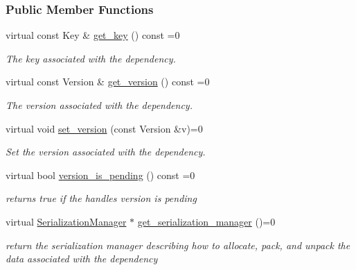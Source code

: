 \subsubsection*{Public Member Functions}
\begin{DoxyCompactItemize}
\item 
virtual const Key \& \hyperlink{classdarma__runtime_1_1abstract_1_1frontend_1_1_dependency_handle_a1691ddba9c8d08dbefe010e6d10b789a}{get\+\_\+key} () const  =0
\begin{DoxyCompactList}\small\item\em The key associated with the dependency. \end{DoxyCompactList}\item 
virtual const Version \& \hyperlink{classdarma__runtime_1_1abstract_1_1frontend_1_1_dependency_handle_a2cc4baf6ffc4fcd03f083c5a24a536de}{get\+\_\+version} () const  =0
\begin{DoxyCompactList}\small\item\em The version associated with the dependency. \end{DoxyCompactList}\item 
virtual void \hyperlink{classdarma__runtime_1_1abstract_1_1frontend_1_1_dependency_handle_a1e4310f0b8c15aa0d8e25c741605fc7b}{set\+\_\+version} (const Version \&v)=0
\begin{DoxyCompactList}\small\item\em Set the version associated with the dependency. \end{DoxyCompactList}\item 
virtual bool \hyperlink{classdarma__runtime_1_1abstract_1_1frontend_1_1_dependency_handle_af5d0a240952f4564a9458e013f2a1f71}{version\+\_\+is\+\_\+pending} () const  =0
\begin{DoxyCompactList}\small\item\em returns true if the handle\textquotesingle{}s version is pending \end{DoxyCompactList}\item 
virtual \hyperlink{classdarma__runtime_1_1abstract_1_1frontend_1_1_serialization_manager}{Serialization\+Manager} $\ast$ \hyperlink{classdarma__runtime_1_1abstract_1_1frontend_1_1_dependency_handle_a5f7255811060d60394ada18074a67231}{get\+\_\+serialization\+\_\+manager} ()=0
\begin{DoxyCompactList}\small\item\em return the serialization manager describing how to allocate, pack, and unpack the data associated with the dependency \end{DoxyCompactList}\item 

\end{DoxyCompactItemize}
